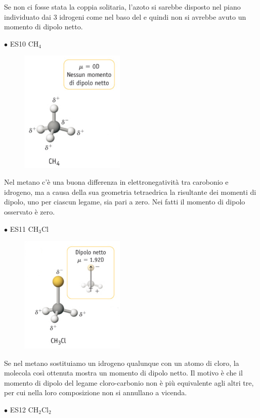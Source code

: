 Se non ci fosse stata la coppia solitaria, l'azoto si sarebbe disposto nel piano individuato dai 3 idrogeni come nel baso del  e quindi non si avrebbe avuto un momento di dipolo netto.

$\bullet$ ES10 CH$_4$

\begin{figure}[htp]
    \centering
    \includegraphics[width=5cm]{immagini/CH_4.png}
\end{figure}
Nel metano c'è una buona differenza in elettronegatività tra carobonio e idrogeno, ma a causa della sua geometria tetraedrica la risultante dei momenti di dipolo, uno per ciascun legame, sia pari a zero. Nei fatti il momento di dipolo osservato è zero.

$\bullet$ ES11 CH$_3$Cl

\begin{figure}[htp]
    \centering
    \includegraphics[width=5cm]{immagini/CH_3Cl.png}
\end{figure}
Se nel metano sostituiamo un idrogeno qualunque con un atomo di cloro, la molecola così ottenuta mostra un momento di dipolo netto. Il motivo è che il momento di dipolo del legame cloro-carbonio non è più equivalente agli altri tre, per cui nella loro composizione non si annullano a vicenda.

$\bullet$ ES12 CH$_2$Cl$_2$


